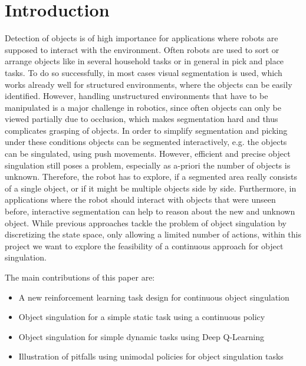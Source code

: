\documentclass{article}
\begin{document}
\section{Introduction}
Detection of objects is of high importance for applications where robots are supposed to interact with the environment. Often robots are used to sort or arrange objects like in several household tasks or in general in pick and place tasks. To do so successfully, in most cases visual segmentation is used, which works already well for structured environments, where the objects can be easily identified.
However, handling unstructured environments that have to be manipulated is a major challenge in robotics, since often objects can only be viewed partially due to occlusion, which makes segmentation hard and thus complicates grasping of objects.
\newline
In order to simplify segmentation and picking under these conditions objects can be segmented interactively, e.g. the objects can be singulated, using push movements. However, efficient and precise object singulation still poses a problem, especially as a-priori the number of objects is unknown. Therefore, the robot has to explore, if a segmented area really consists of a single object, or if it might be multiple objects side by side. Furthermore, in applications where the robot should interact with objects that were unseen before, interactive segmentation can help to reason about the new and unknown object.
\newline
While previous approaches tackle the problem of object singulation by discretizing the state space, only allowing a limited number of actions, within this project we want to explore the feasibility of a continuous approach for object singulation. 

The main contributions of this paper are:
\begin{itemize}
\item A new reinforcement learning task design for continuous object singulation
\item Object singulation for a simple static task using a continuous policy
\item Object singulation for simple dynamic tasks using Deep Q-Learning
\item Illustration of pitfalls using unimodal policies
for object singulation tasks
\end{itemize}
\end{document}
